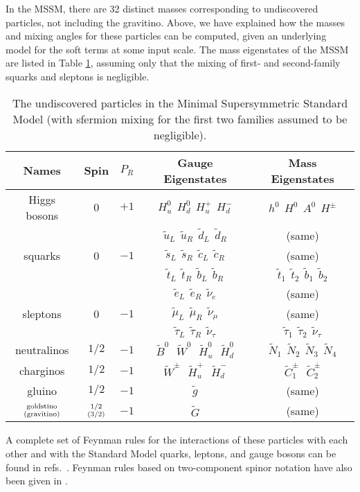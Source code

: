 \documentclass[11pt]{article}
\def\stilde{\widetilde}
\begin{document}
In the MSSM, there are 32 distinct masses corresponding to undiscovered 
particles, not including the gravitino. Above, we have explained 
how the masses and mixing angles for these particles can be computed, 
given an underlying model for the soft terms at some input scale. 
The mass eigenstates of the MSSM are listed in Table
\ref{tab:undiscovered}, assuming 
only that the mixing of first- and second-family squarks and sleptons is 
negligible.%
\renewcommand{\arraystretch}{1.4}
\begin{table}[tb]
\begin{center}
\begin{tabular}{|c|c|c|c|c|}
\hline
Names & Spin & $P_R$ & Gauge Eigenstates & Mass Eigenstates \\
\hline\hline
Higgs bosons & 0 & $+1$ & 
$H_u^0\>\> H_d^0\>\> H_u^+ \>\> H_d^-$ 
& 
$h^0\>\> H^0\>\> A^0 \>\> H^\pm$
\\ \hline
& & &${\stilde u}_L\>\> {\stilde u}_R\>\> \stilde d_L\>\> \stilde d_R$&(same)
\\
squarks& 0&$-1$& ${\stilde s}_L\>\> {\stilde s}_R\>\> \stilde c_L\>\>
\stilde c_R$& (same) \\
& & &
$\stilde t_L \>\>\stilde t_R \>\>\stilde b_L\>\> \stilde b_R$ 
&
${\stilde t}_1\>\> {\stilde t}_2\>\> \stilde b_1\>\> \stilde b_2$
\\ \hline
& & &${\stilde e}_L\>\> {\stilde e}_R \>\>\stilde \nu_e$&(same) 
\\
sleptons& 0&$-1$&${\stilde \mu}_L\>\>{\stilde \mu}_R\>\>\stilde\nu_\mu$&(same)
\\
& & &
$\stilde \tau_L\>\> \stilde \tau_R \>\>\stilde \nu_\tau$ 
&
${\stilde \tau}_1 \>\>{\stilde \tau}_2 \>\>\stilde \nu_\tau$
\\
\hline
neutralinos & $1/2$&$-1$ & 
$\stilde B^0 \>\>\>\stilde W^0\>\>\> \stilde H_u^0\>\>\> \stilde H_d^0$   
&
$\stilde N_1\>\> \stilde N_2 \>\>\stilde N_3\>\> \stilde N_4$ 
\\
\hline
charginos & $1/2$&$-1$ & 
$\stilde W^\pm\>\>\> \stilde H_u^+ \>\>\>\stilde H_d^-$ 
&
$\stilde C_1^\pm\>\>\>\stilde C_2^\pm $ 
\\
\hline
gluino & $1/2$&$-1$ &$\stilde g$  &(same) \\
\hline
${\rm goldstino}\atop{\rm (gravitino)}$ & ${1/2}\atop{(3/2)}$&$-1$&$\stilde 
G$  &(same) \\
\hline
\end{tabular}
\caption{The undiscovered particles in the Minimal Supersymmetric Standard 
Model (with sfermion mixing for the first two families assumed to be 
negligible). 
\label{tab:undiscovered}}
\vspace{-0.4cm}
\end{center}
\end{table}%
A complete set of Feynman rules for the 
interactions of these particles with each other and with the Standard 
Model quarks, leptons, and gauge bosons can be found in 
refs.~\cite{HaberKanereview,GunionHaber}. 
Feynman rules 
based on two-component spinor notation have also  been given in 
\cite{DHM}.
\end{document}
